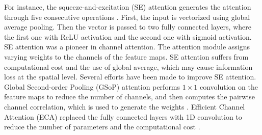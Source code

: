 \documentclass[preprint,12pt]{elsarticle}
\begin{document}
For instance, the squeeze-and-excitation (SE) attention generates the attention through five consecutive operations \citep{hu_squeeze-and-excitation_2019}. First, the input is vectorized using global average pooling. Then the vector is passed to two fully connected layers, where the first one with ReLU activation and the second one with sigmoid activation. SE attention was a pioneer in channel attention. The attention module assigns varying weights to the channels of the feature maps. SE attention suffers from computational cost and the use of global average, which may cause information loss at the spatial level. Several efforts have been made to improve SE attention. Global Second-order Pooling (GSoP) attention performs $1 \times 1$ convolution on the feature maps to reduce the number of channels, and then computes the pairwise channel correlation, which is used to generate the weights \citep{gao_global_2018}. Efficient Channel Attention (ECA) replaced the fully connected layers with 1D convolution to reduce the number of parameters and the computational cost \citep{wang_eca-net_2020}.
\end{document}
